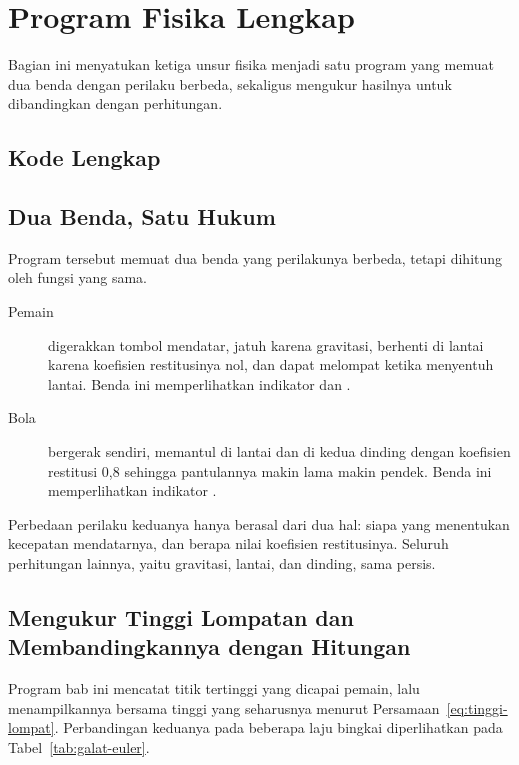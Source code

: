 \section{Program Fisika Lengkap}
\label{sec:program-fisika}

Bagian ini menyatukan ketiga unsur fisika menjadi satu program yang memuat dua
benda dengan perilaku berbeda, sekaligus mengukur hasilnya untuk dibandingkan
dengan perhitungan.

\subsection{Kode Lengkap}


\subsection{Dua Benda, Satu Hukum}

Program tersebut memuat dua benda yang perilakunya berbeda, tetapi dihitung
oleh fungsi yang sama.

\begin{description}
  \item[Pemain] digerakkan tombol mendatar, jatuh karena gravitasi, berhenti di
        lantai karena koefisien restitusinya nol, dan dapat melompat ketika
        menyentuh lantai. Benda ini memperlihatkan indikator  dan
        .
  \item[Bola] bergerak sendiri, memantul di lantai dan di kedua dinding dengan
        koefisien restitusi 0,8 sehingga pantulannya makin lama makin pendek.
        Benda ini memperlihatkan indikator .
\end{description}

Perbedaan perilaku keduanya hanya berasal dari dua hal: siapa
yang menentukan kecepatan mendatarnya, dan berapa nilai koefisien restitusinya.
Seluruh perhitungan lainnya, yaitu gravitasi, lantai, dan dinding, sama persis.

\subsection{Mengukur Tinggi Lompatan dan Membandingkannya dengan Hitungan}

Program bab ini mencatat titik tertinggi yang dicapai pemain, lalu
menampilkannya bersama tinggi yang seharusnya menurut Persamaan~\eqref{eq:tinggi-lompat}.
Perbandingan keduanya pada beberapa laju bingkai diperlihatkan pada
Tabel~\ref{tab:galat-euler}.

